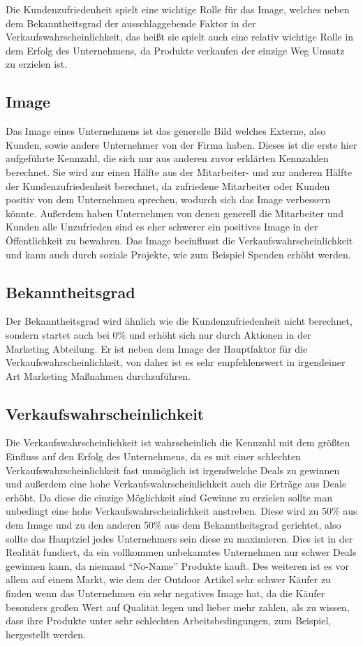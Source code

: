 Die Kundenzufriedenheit spielt eine wichtige Rolle für das Image, welches neben dem Bekanntheitsgrad der ausschlaggebende Faktor in der Verkaufswahrscheinlichkeit, das heißt sie spielt auch eine relativ wichtige Rolle in dem Erfolg des Unternehmens, da Produkte verkaufen der einzige Weg Umsatz zu erzielen ist.  
\subsection{Image}
Das Image eines Unternehmens ist das generelle Bild welches Externe, also Kunden, sowie andere Unternehmer von der Firma haben. Dieses ist die erste hier aufgeführte Kennzahl, die sich nur aus anderen zuvor erklärten Kennzahlen berechnet. Sie wird zur einen Hälfte aus der Mitarbeiter- und zur anderen Hälfte der Kundenzufriedenheit berechnet, da zufriedene Mitarbeiter oder Kunden positiv von dem Unternehmen sprechen, wodurch sich das Image verbessern könnte. Außerdem haben Unternehmen von denen generell die Mitarbeiter und Kunden alle Unzufrieden sind es eher schwerer ein positives Image in der Öffentlichkeit zu bewahren. 
Das Image beeinflusst die Verkaufswahrscheinlichkeit und kann auch durch soziale Projekte, wie zum Beispiel Spenden erhöht werden.
\subsection{Bekanntheitsgrad}
Der Bekanntheitsgrad wird ähnlich wie die Kundenzufriedenheit nicht berechnet, sondern startet auch bei 0\% und erhöht sich nur durch Aktionen in der Marketing Abteilung. Er ist neben dem Image der Hauptfaktor für die Verkaufswahrscheinlichkeit, von daher ist es sehr empfehlenswert in irgendeiner Art Marketing Maßnahmen durchzuführen. 
\subsection{Verkaufswahrscheinlichkeit}
Die Verkaufswahrscheinlichkeit ist wahrscheinlich die Kennzahl mit dem größten Einfluss auf den Erfolg des Unternehmens, da es mit einer schlechten Verkaufswahrscheinlichkeit fast unmöglich ist irgendwelche Deals zu gewinnen und außerdem eine hohe Verkaufswahrscheinlichkeit auch die Erträge aus Deals erhöht. Da diese die einzige Möglichkeit sind Gewinne zu erzielen sollte man unbedingt eine hohe Verkaufswahrscheinlichkeit anstreben. Diese wird zu 50\% aus dem Image und zu den anderen 50\% aus dem Bekanntheitsgrad gerichtet, also sollte das Hauptziel jedes Unternehmers sein diese zu maximieren. Dies ist in der Realität fundiert, da ein vollkommen unbekanntes Unternehmen nur schwer Deals gewinnen kann, da niemand \enquote{No-Name} Produkte kauft. Des weiteren ist es vor allem auf einem Markt, wie dem der Outdoor Artikel sehr schwer Käufer zu finden wenn das Unternehmen ein sehr negatives Image hat, da die Käufer besonders großen Wert auf Qualität legen und lieber mehr zahlen, als zu wissen, dass ihre Produkte unter sehr schlechten Arbeitsbedingungen, zum Beispiel, hergestellt werden. 

